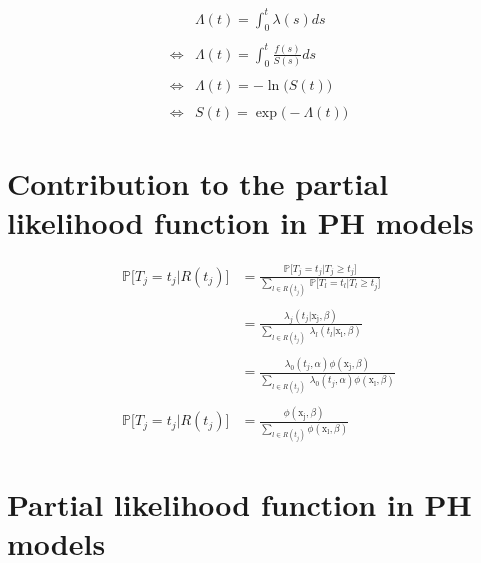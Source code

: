 \documentclass[
]{book}
\begin{document}
\begin{equation}
  \begin{aligned}
       & \Lambda(t) = \int_{0}^{t} \lambda(s)ds \\\\
  \iff & \Lambda(t) = \int_{0}^{t} \frac{f(s)}{S(s)}ds \\\\
  \iff & \Lambda(t) = -\ln \big(S(t)\big) \\\\
  \iff & S(t) = \exp \big(-\Lambda(t)\big)
  \end{aligned}
  \label{eq:linksurvcumhaz}
\end{equation}

\hypertarget{contribution-to-the-partial-likelihood-function-in-ph-models}{%
\section*{Contribution to the partial likelihood function in PH models}\label{contribution-to-the-partial-likelihood-function-in-ph-models}}

\begin{equation}
\begin{aligned}
  \mathbb{P}\big[T_j = t_j | R(t_j) \big] & = \frac{\mathbb{P}\big[T_j = t_j | T_j \geq t_j \big]}{\sum_{l \in R(t_j)} \ \mathbb{P}\big[T_l = t_l | T_l \geq t_j \big]} \\\\
  & = \frac{\lambda_j(t_j|\mathrm{x_j}, \beta)}{\sum_{l \in R(t_j)} \ \lambda_l(t_l|\mathrm{x_l}, \beta)} \\\\
  & = \frac{\lambda_0 (t_j, \alpha)\phi(\mathrm{x_j}, \beta)}{\sum_{l \in R(t_j)} \ \lambda_0 (t_j, \alpha)\phi(\mathrm{x_l}, \beta)} \\\\
  \mathbb{P}\big[T_j = t_j | R(t_j) \big] & = \frac{\phi(\mathrm{x_j}, \beta)}{\sum_{l \in R(t_j)} \phi(\mathrm{x_l}, \beta)}
\end{aligned}
\label{eq:contribpartiallikproof}
\end{equation}

\hypertarget{partial-likelihood-function-in-ph-models}{%
\section*{Partial likelihood function in PH models}\label{partial-likelihood-function-in-ph-models}}
\end{document}
